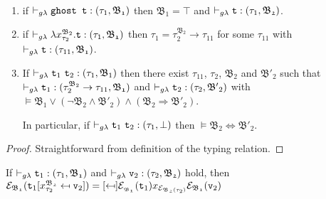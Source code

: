 \begin{lemma}~\\
\vspace{-0.5cm}
\begin{enumerate}
	\item 
	if $\vdash_{g\lambda} \texttt{ghost t} : (\tau_{1}, \mathfrak{B_{1}})$ 
	then	$ \mathfrak{B_{1}} = \top $ 
	and $\vdash_{g\lambda} \texttt{t} : (\tau_{1}, \mathfrak{B_{2}}) $.
	
 	\item
 	if $\vdash_{g\lambda} \lambda x_{\tau_{2}}^{\mathfrak{B}_{2}}.\texttt{t} : (\tau_{1}, \mathfrak{B_{1}})$
 	then $\tau_{1} = \tau_{2}^{\mathfrak{B}_{2}} \rightarrow \tau_{11}$
 	for some $\tau_{11}$ with \mbox{$\vdash_{g\lambda} \texttt{t} : (\tau_{11}, \mathfrak{B_{1}}) $}.
  
 \item 
 	If ${\vdash_{g\lambda} \texttt{t}_{1}~ \texttt{t}_{2}  : (\tau_{1}, \mathfrak{B}_{1})}$
	then there exist $\tau_{11}$, $\tau_{2}$, $\mathfrak{B_{2}}$ and 	
	$\mathfrak{B'_{2}}$
	such that \\ 
	$\vdash_{g\lambda} \texttt{t}_{1} : (\tau_{2}^{\mathfrak{B}_{2}} \rightarrow \tau_{11}, \mathfrak{B_{1}})$
		and 
	${\vdash_{g\lambda} \texttt{t}_{2} : (\tau_{2}, \mathfrak{B'}_{2})}$ with \\
	 \quad
	\mbox{$\vDash \mathfrak{B}_{1} \vee (\neg \mathfrak{B}_{2} \wedge \mathfrak{B'}_{2} ) \wedge (\mathfrak{B}_{2} \Rightarrow \mathfrak{B'}_{2})$}. 
	
	In particular, if 
 		${\vdash_{g\lambda} \texttt{t}_{1}~ \texttt{t}_{2}  : (\tau_{1}, \bot)}$
then $\vDash \mathfrak{B_{2}} \Leftrightarrow \mathfrak{B'_{2}} $.
\end{enumerate}
\end{lemma} 
\begin{proof}
Straightforward from definition of the typing relation.
\end{proof}
\begin{lemma} 
	If $\vdash_{g\lambda} \texttt{t}_{1} : (\tau_{1}, \mathfrak{B_{1}})$  
	and \mbox{$\vdash_{g\lambda} \texttt{v}_{2} : (\tau_{2}, \mathfrak{B_{2}})$}	
	hold, then ~~
	$\e_{\mathfrak{B_{1}}}
	(\sbst
		{\texttt{t}_{1}}
		{x^{\mathfrak{B_{2}}}_{\tau_{2}}}
		{\texttt{v}_{2}})
	= \sbst
			{\e_{\mathfrak{_{B_{1}}}}(\texttt{t}_{1})}
			{x_{\e_{\mathfrak{B_{2}}(\tau_{2})}}}
			{\e_{\mathfrak{B_{1}}}(\texttt{v}_{2})}$
\label{Substitution under erasure}
\end{lemma}
